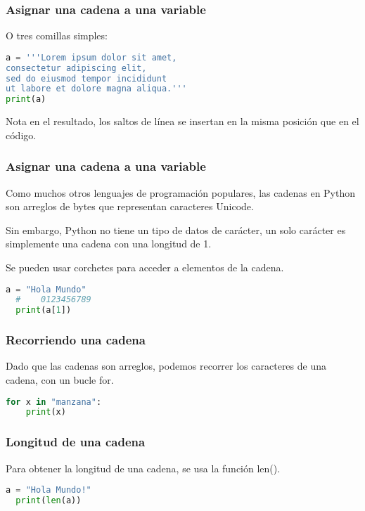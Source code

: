 \begin{frame}[fragile]
  \frametitle{Asignar una cadena a una variable}

  O tres comillas simples: 

  \begin{lstlisting}[language=Python]
a = '''Lorem ipsum dolor sit amet,
consectetur adipiscing elit,
sed do eiusmod tempor incididunt
ut labore et dolore magna aliqua.'''
print(a) 
  \end{lstlisting}

  \begin{alertblock}{Nota}
    en el resultado, los saltos de línea se insertan en la misma
    posición que en el código.
  \end{alertblock}
\end{frame}

\begin{frame}[fragile]
  \frametitle{Asignar una cadena a una variable}

  Como muchos otros lenguajes de programación populares, las cadenas
  en Python son arreglos de bytes que representan caracteres Unicode.

  \vspace{\baselineskip}
  Sin embargo, Python no tiene un tipo de datos de carácter, un solo
  carácter es simplemente una cadena con una longitud de 1.

  \vspace{\baselineskip}
  Se pueden usar corchetes para acceder a elementos de la cadena. 

  \begin{lstlisting}[language=Python]
  a = "Hola Mundo"
  #    0123456789
  print(a[1])
  \end{lstlisting}
\end{frame}

\begin{frame}[fragile]
  \frametitle{Recorriendo una cadena}

  Dado que las cadenas son arreglos, podemos recorrer los caracteres
  de una cadena, con un bucle \textcolor{codeKeyword}{for}.

  \vspace{\baselineskip}
  \begin{lstlisting}[language=Python]
  for x in "manzana":
    print(x)
  \end{lstlisting}
\end{frame}

\begin{frame}[fragile]
  \frametitle{Longitud de una cadena}

  Para obtener la longitud de una cadena, se usa la función 
  \textcolor{codeKeyword}{len}().

  \vspace{\baselineskip}
  \begin{lstlisting}[language=Python]
  a = "Hola Mundo!"
  print(len(a))
  \end{lstlisting}
\end{frame}

